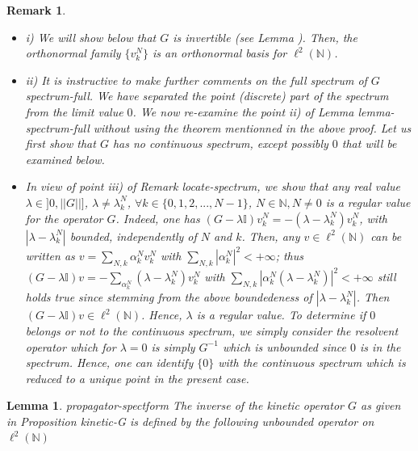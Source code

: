 \documentclass[10pt]{book}
\theoremstyle{break}
\newtheorem{lemma}{Lemma}
\newtheorem{remark}{Remark}
\begin{document}
\begin{remark} 
\begin{itemize}
\item i) We will show below that $G$ is invertible (see Lemma ). Then, the orthonormal family $\{v^N_k \}$ is an orthonormal basis for $\ell^2(\mathbb{N})$.
\item ii) It is instructive to make further comments on the full spectrum of $G$ {spectrum-full}. We have separated the point (discrete) part of the spectrum from the limit value $0$. We now re-examine the point ii) of Lemma {lemma-spectrum-full} without using the theorem mentionned in the above proof. Let us first show that $G$ has no continuous spectrum, except possibly $0$ that will be examined below.
\item In view of point iii) of Remark {locate-spectrum}, we show that any real value $\lambda\in]0,||G||]$, $\lambda\ne\lambda^N_k$, $\forall k\in\{0,1,2,...,N-1 \}$, $N\in\mathbb{N}, N\ne0$ is a regular value for the operator $G$. Indeed, one has $(G-\lambda\mathbb{I})v^N_k=-(\lambda-\lambda^N_k)v^N_k$, with $|\lambda-\lambda^N_k|$ bounded, independently of $N$ and $k$. Then, any $v\in\ell^2(\mathbb{N})$ can be written as $v=\sum_{N,k}\alpha^N_kv^N_k$ with $\sum_{N,k}|\alpha^N_k|^2<+\infty$; thus $(G-\lambda\mathbb{I})v=-\sum_{\alpha^N_k}(\lambda-\lambda^N_k)v^N_k$ with $\sum_{N,k}|\alpha^N_k(\lambda-\lambda^N_k)
|^2<+\infty$ still holds true since stemming from the above boundedeness of $|\lambda-\lambda^N_k|$. Then $(G-\lambda\mathbb{I})v\in\ell^2(\mathbb{N})$. Hence, $\lambda$ is a regular value. To determine if $0$ belongs or not to the continuous spectrum, we simply consider the resolvent operator which for $\lambda=0$ is simply $G^{-1}$ which is unbounded since $0$ is in the spectrum. Hence, one can identify $\{0\}$ with the continuous spectrum which is reduced to a unique point in the present case.
\end{itemize}
\end{remark}
\begin{lemma}{propagator-spectform}
The inverse of the kinetic operator $G$ as given in Proposition {kinetic-G} is defined by the following unbounded operator on $\ell^2(\mathbb{N})$
\end{lemma}
\end{document}
